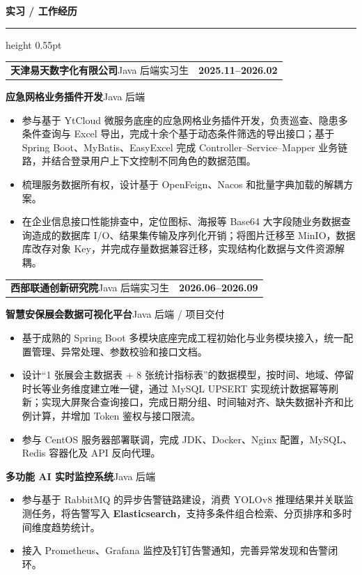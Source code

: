 \documentclass[UTF8,a4paper,9pt]{ctexart}
\makeatletter
\newcommand{\sectiontitle}[1]{%
  \vspace{1.5pt}%
  {\color{navy}\bfseries\fontsize{10.5pt}{11.5pt}\selectfont #1}\par
  \vspace{0.5pt}\color{navy}\hrule height 0.55pt\color{black}\vspace{1pt}%
}
\newcommand{\entry}[3]{%
  \begin{tabularx}{\linewidth}{@{}Xr@{}}
    \textbf{#1}\enspace\textbar\enspace #2 & \textbf{#3}
  \end{tabularx}%
}
\makeatother
\begin{document}
\sectiontitle{实习 / 工作经历}
\entry{天津易天数字化有限公司}{Java 后端实习生}{2025.11--2026.02}
\textbf{应急网格业务插件开发}\enspace\textbar\enspace Java 后端\par
\begin{itemize}
  \item 参与基于 YtCloud 微服务底座的应急网格业务插件开发，负责巡查、隐患多条件查询与 Excel 导出，完成十余个基于动态条件筛选的导出接口；基于 Spring Boot、MyBatis、EasyExcel 完成 Controller--Service--Mapper 业务链路，并结合登录用户上下文控制不同角色的数据范围。
  \item 梳理服务数据所有权，设计基于 OpenFeign、Nacos 和批量字典加载的解耦方案。
  \item 在企业信息接口性能排查中，定位图标、海报等 Base64 大字段随业务数据查询造成的数据库 I/O、结果集传输及序列化开销；将图片迁移至 MinIO，数据库改存对象 Key，并完成存量数据兼容迁移，实现结构化数据与文件资源解耦。
\end{itemize}
\entry{西部联通创新研究院}{Java 后端实习生}{2026.06--2026.09}
\textbf{智慧安保展会数据可视化平台}\enspace\textbar\enspace Java 后端 / 项目交付\par
\begin{itemize}
  \item 基于成熟的 Spring Boot 多模块底座完成工程初始化与业务模块接入，统一配置管理、异常处理、参数校验和接口文档。
  \item 设计“1 张展会主数据表 + 8 张统计指标表”的数据模型，按时间、地域、停留时长等业务维度建立唯一键，通过 MySQL UPSERT 实现统计数据幂等刷新；实现大屏聚合查询接口，完成日期分组、时间轴对齐、缺失数据补齐和比例计算，并增加 Token 鉴权与接口限流。
  \item 参与 CentOS 服务器部署联调，完成 JDK、Docker、Nginx 配置，MySQL、Redis 容器化及 API 反向代理。
\end{itemize}
\textbf{多功能 AI 实时监控系统}\enspace\textbar\enspace Java 后端\par
\begin{itemize}
  \item 参与基于 RabbitMQ 的异步告警链路建设，消费 YOLOv8 推理结果并关联监测任务，将告警写入 \textbf{Elasticsearch}，支持多条件组合检索、分页排序和多时间维度趋势统计。
  \item 接入 Prometheus、Grafana 监控及钉钉告警通知，完善异常发现和告警闭环。
\end{itemize}
\end{document}
